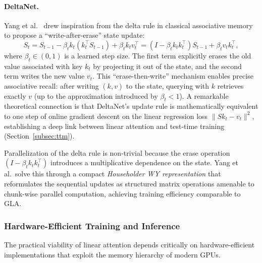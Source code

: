 \paragraph{DeltaNet.}
Yang et al.~\cite{yang2024deltanet} drew inspiration from the delta rule in classical associative memory to propose a ``write-after-erase'' state update:
\begin{equation}
S_t = S_{t-1} - \beta_t k_t (k_t^\top S_{t-1}) + \beta_t k_t v_t^\top = (I - \beta_t k_t k_t^\top) S_{t-1} + \beta_t v_t k_t^\top,
\label{eq:deltanet}
\end{equation}
where $\beta_t \in (0, 1)$ is a learned step size. The first term explicitly erases the old value associated with key $k_t$ by projecting it out of the state, and the second term writes the new value $v_t$. This ``erase-then-write'' mechanism enables precise associative recall: after writing $(k, v)$ to the state, querying with $k$ retrieves exactly $v$ (up to the approximation introduced by $\beta_t < 1$). A remarkable theoretical connection is that DeltaNet's update rule is mathematically equivalent to one step of online gradient descent on the linear regression loss $\|S k_t - v_t\|^2$, establishing a deep link between linear attention and test-time training (Section~\ref{subsec:ttm}).

Parallelization of the delta rule is non-trivial because the erase operation $(I - \beta_t k_t k_t^\top)$ introduces a multiplicative dependence on the state. Yang et al.\ solve this through a compact \emph{Householder WY representation} that reformulates the sequential updates as structured matrix operations amenable to chunk-wise parallel computation, achieving training efficiency comparable to GLA.

\subsubsection{Hardware-Efficient Training and Inference}
\label{subsubsec:hw-linear}

The practical viability of linear attention depends critically on hardware-efficient implementations that exploit the memory hierarchy of modern GPUs.

